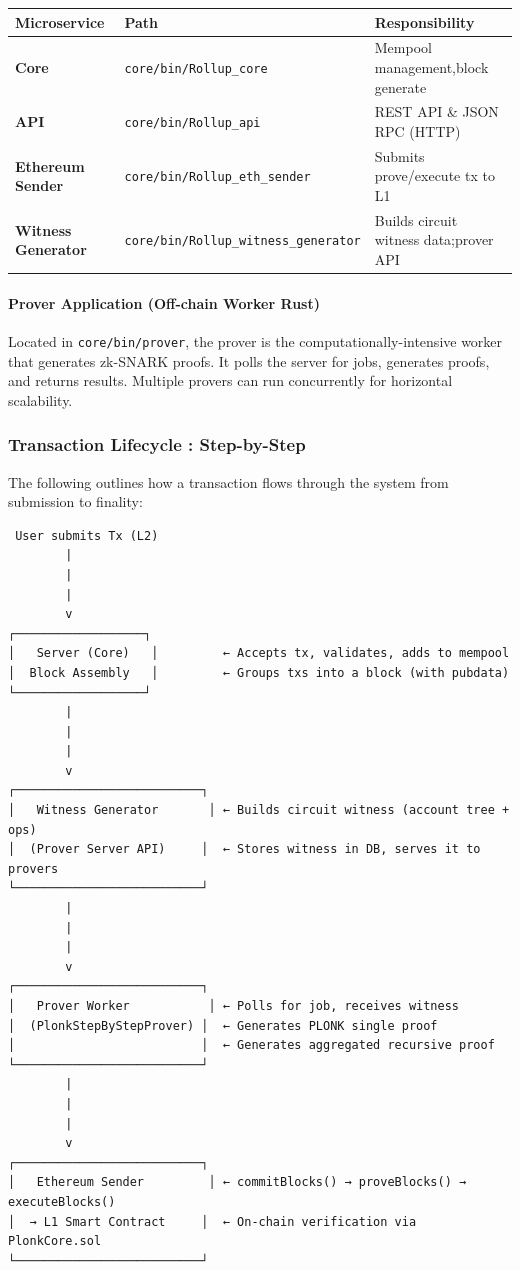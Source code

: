 \begin{table}[h]
\centering
\begin{tabular}{lll}
\toprule
\textbf{Microservice} & \textbf{Path} & \textbf{Responsibility} \\
\midrule
\textbf{Core} & \texttt{core/bin/Rollup\_core} & Mempool management,block generate \\
\textbf{API} & \texttt{core/bin/Rollup\_api} & REST API \& JSON RPC (HTTP) \\
\textbf{Ethereum Sender} & \texttt{core/bin/Rollup\_eth\_sender} & Submits prove/execute tx to L1 \\
\textbf{Witness Generator} & \texttt{core/bin/Rollup\_witness\_generator} & Builds circuit witness data;prover API \\
\bottomrule
\end{tabular}
\end{table}

\paragraph{Prover Application (Off-chain Worker Rust)}

Located in \texttt{core/bin/prover}, the prover is the computationally-intensive worker that generates zk-SNARK proofs. It polls the server for jobs, generates proofs, and returns results. Multiple provers can run concurrently for horizontal scalability.

\subsubsection{Transaction Lifecycle : Step-by-Step}

The following outlines how a transaction flows through the system from submission to finality:

\begin{verbatim}
 User submits Tx (L2)
        |
        |
        |
        v
┌──────────────────┐
│   Server (Core)   │         ← Accepts tx, validates, adds to mempool
│  Block Assembly   │         ← Groups txs into a block (with pubdata)
└──────────────────┘
        |
        |
        |
        v
┌──────────────────────────┐
│   Witness Generator       │ ← Builds circuit witness (account tree + ops)
│  (Prover Server API)     │  ← Stores witness in DB, serves it to provers
└──────────────────────────┘
        |
        |
        |
        v
┌──────────────────────────┐
│   Prover Worker           │ ← Polls for job, receives witness
│  (PlonkStepByStepProver) │  ← Generates PLONK single proof
│                          │  ← Generates aggregated recursive proof
└──────────────────────────┘
        |
        | 
        |
        v
┌──────────────────────────┐
│   Ethereum Sender         │ ← commitBlocks() → proveBlocks() → executeBlocks()
│  → L1 Smart Contract     │  ← On-chain verification via PlonkCore.sol
└──────────────────────────┘
\end{verbatim}

